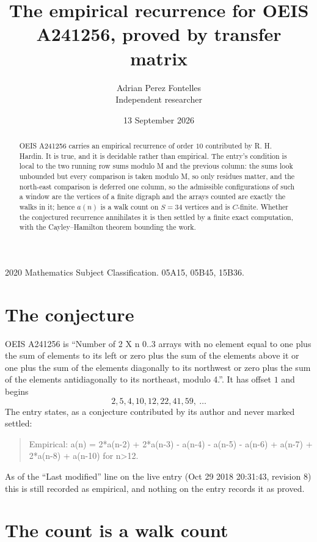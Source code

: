 \documentclass[11pt,a4paper]{article}
\title{The empirical recurrence for OEIS A241256, proved by transfer matrix}
\author{Adrian Perez Fontelles\\ \small Independent researcher}
\date{13 September 2026}
\theoremstyle{plain}
\theoremstyle{definition}
\begin{document}
\maketitle

\begin{abstract}
OEIS A241256 carries an empirical recurrence of order $10$ contributed by R. H. Hardin. It is
true, and it is decidable rather than empirical. The entry's condition is local to the two running row sums modulo M and the previous column: the sums look unbounded but every comparison is taken modulo M, so only residues matter, and the north-east comparison is deferred one column, so
the admissible configurations of such a window are the vertices of a finite digraph and the
arrays counted are exactly the walks in it; hence $a(n)$ is a walk count on $S=34$ vertices
and is $C$-finite. Whether the conjectured recurrence annihilates it is then settled by a
finite exact computation, with the Cayley--Hamilton theorem bounding the work.
\end{abstract}

\noindent\small 2020 Mathematics Subject Classification. 05A15, 05B45, 15B36.\normalsize

\section{The conjecture}

OEIS A241256 is ``Number of 2 X n 0..3 arrays with no element equal to one plus the sum of elements to its left or zero plus the sum of the elements above it or one plus the sum of the elements diagonally to its northwest or zero plus the sum of the elements antidiagonally to its northeast, modulo 4.''. It has offset $1$ and begins
\[
2, 5, 4, 10, 12, 22, 41, 59,\ \dots
\]
The entry states, as a conjecture contributed by its author and never marked settled:
\begin{quote}
Empirical: a(n) = 2*a(n-2) + 2*a(n-3) - a(n-4) - a(n-5) - a(n-6) + a(n-7) + 2*a(n-8) + a(n-10) for n>12.
\end{quote}
As of the ``Last modified'' line on the live entry (Oct 29 2018 20:31:43, revision 8) this is still
recorded as empirical, and nothing on the entry records it as proved.

\section{The count is a walk count}
\end{document}
